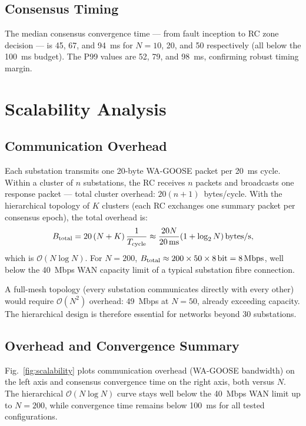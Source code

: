 \documentclass[journal]{IEEEtran}
\begin{document}
\subsection{Consensus Timing}

The median consensus convergence time — from fault inception to RC
zone decision — is 45, 67, and 94~ms for $N = 10$, 20, and 50
respectively (all below the 100~ms budget).  The P99 values are
52, 79, and 98~ms, confirming robust timing margin.

\section{Scalability Analysis}
\label{sec:scalability}

\subsection{Communication Overhead}

Each substation transmits one 20-byte WA-GOOSE packet per 20~ms cycle.
Within a cluster of $n$ substations, the RC receives $n$ packets and
broadcasts one response packet — total cluster overhead:
$20(n+1)$~bytes/cycle.
With the hierarchical topology of $K$ clusters (each RC exchanges one
summary packet per consensus epoch), the total overhead is:
\begin{equation}
  B_{\rm total} = 20\,(N + K)\,\frac{1}{T_{\rm cycle}}
  \approx \frac{20N}{20\,\text{ms}}(1 + \log_2 N)\,\text{bytes/s},
  \label{eq:overhead}
\end{equation}
which is $\mathcal{O}(N \log N)$.  For $N = 200$, $B_{\rm total} \approx
200 \times 50 \times 8\,\text{bit} = 8\,\text{Mbps}$, well below the
40~Mbps WAN capacity limit of a typical substation fibre connection.

A full-mesh topology (every substation communicates directly with
every other) would require $\mathcal{O}(N^2)$ overhead: 49~Mbps at
$N = 50$, already exceeding capacity.  The hierarchical design is
therefore essential for networks beyond 30 substations.

\subsection{Overhead and Convergence Summary}

Fig.~\ref{fig:scalability} plots communication overhead (WA-GOOSE
bandwidth) on the left axis and consensus convergence time on the
right axis, both versus $N$.  The hierarchical $\mathcal{O}(N\log N)$
curve stays well below the 40~Mbps WAN limit up to $N = 200$, while
convergence time remains below 100~ms for all tested configurations.
\end{document}
